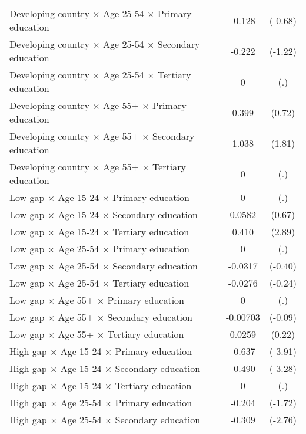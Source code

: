 {\begin{longtable}{l*{1}{cc}}
Developing country $\times$ Age 25-54 $\times$ Primary education&      -0.128         &     (-0.68)\\
Developing country $\times$ Age 25-54 $\times$ Secondary education&      -0.222         &     (-1.22)\\
Developing country $\times$ Age 25-54 $\times$ Tertiary education&           0         &         (.)\\
Developing country $\times$ Age 55+ $\times$ Primary education&       0.399         &      (0.72)\\
Developing country $\times$ Age 55+ $\times$ Secondary education&       1.038         &      (1.81)\\
Developing country $\times$ Age 55+ $\times$ Tertiary education&           0         &         (.)\\
Low gap $\times$ Age 15-24 $\times$ Primary education&           0         &         (.)\\
Low gap $\times$ Age 15-24 $\times$ Secondary education&      0.0582         &      (0.67)\\
Low gap $\times$ Age 15-24 $\times$ Tertiary education&       0.410\sym{**} &      (2.89)\\
Low gap $\times$ Age 25-54 $\times$ Primary education&           0         &         (.)\\
Low gap $\times$ Age 25-54 $\times$ Secondary education&     -0.0317         &     (-0.40)\\
Low gap $\times$ Age 25-54 $\times$ Tertiary education&     -0.0276         &     (-0.24)\\
Low gap $\times$ Age 55+ $\times$ Primary education&           0         &         (.)\\
Low gap $\times$ Age 55+ $\times$ Secondary education&    -0.00703         &     (-0.09)\\
Low gap $\times$ Age 55+ $\times$ Tertiary education&      0.0259         &      (0.22)\\
High gap $\times$ Age 15-24 $\times$ Primary education&      -0.637\sym{***}&     (-3.91)\\
High gap $\times$ Age 15-24 $\times$ Secondary education&      -0.490\sym{**} &     (-3.28)\\
High gap $\times$ Age 15-24 $\times$ Tertiary education&           0         &         (.)\\
High gap $\times$ Age 25-54 $\times$ Primary education&      -0.204         &     (-1.72)\\
High gap $\times$ Age 25-54 $\times$ Secondary education&      -0.309\sym{**} &     (-2.76)\\

\end{longtable}}
